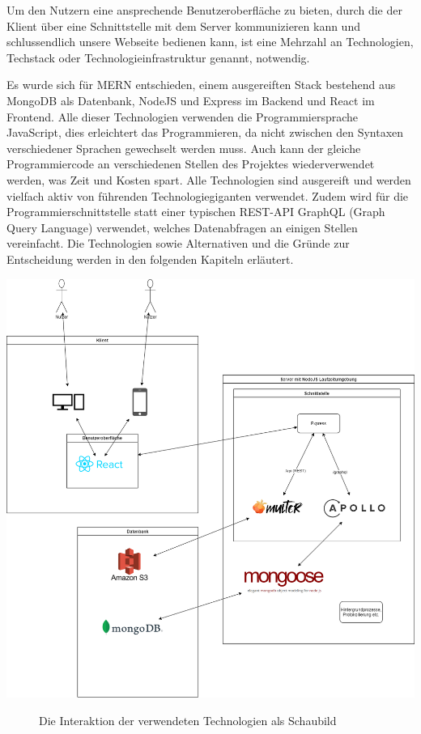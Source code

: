 Um den Nutzern eine ansprechende Benutzeroberfläche zu bieten, durch die der Klient über eine Schnittstelle mit dem Server kommunizieren kann und schlussendlich unsere Webseite bedienen kann, ist eine Mehrzahl an Technologien, Techstack oder Technologieinfrastruktur genannt, notwendig.

Es wurde sich für MERN entschieden, einem ausgereiften Stack bestehend aus MongoDB als Datenbank, NodeJS und Express im Backend und React im Frontend. Alle dieser Technologien verwenden die Programmiersprache JavaScript, dies erleichtert das Programmieren, da nicht zwischen den Syntaxen verschiedener Sprachen gewechselt werden muss. Auch kann der gleiche Programmiercode an verschiedenen Stellen des Projektes wiederverwendet werden, was Zeit und Kosten spart. Alle Technologien sind ausgereift und werden vielfach aktiv von führenden Technologiegiganten verwendet. Zudem wird für die Programmierschnittstelle statt einer typischen REST-API GraphQL (Graph Query Language) verwendet, welches Datenabfragen an einigen Stellen vereinfacht. Die Technologien sowie Alternativen und die Gründe zur Entscheidung werden in den folgenden Kapiteln erläutert.

\includegraphics[width=\textwidth]{sources/MERN-Stack_Schaubild.drawio}
\begin{figure}[ht]
	\centering
	\caption{Die Interaktion der verwendeten Technologien als Schaubild}
	\label{figMERN1}
\end{figure}

